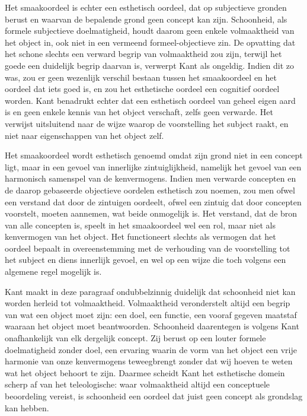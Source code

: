 \begin{mdframed}[leftmargin=0pt,rightmargin=0pt,backgroundcolor=blue!6,linecolor=white,innertopmargin=6pt,innerbottommargin=6pt]
Het smaakoordeel is echter een esthetisch oordeel, dat op subjectieve gronden berust en waarvan de bepalende grond geen concept kan zijn. Schoonheid, als formele subjectieve doelmatigheid, houdt daarom geen enkele volmaaktheid van het object in, ook niet in een vermeend formeel-objectieve zin. De opvatting dat het schone slechts een verward begrip van volmaaktheid zou zijn, terwijl het goede een duidelijk begrip daarvan is, verwerpt Kant als ongeldig. Indien dit zo was, zou er geen wezenlijk verschil bestaan tussen het smaakoordeel en het oordeel dat iets goed is, en zou het esthetische oordeel een cognitief oordeel worden. Kant benadrukt echter dat een esthetisch oordeel van geheel eigen aard is en geen enkele kennis van het object verschaft, zelfs geen verwarde. Het verwijst uitsluitend naar de wijze waarop de voorstelling het subject raakt, en niet naar eigenschappen van het object zelf.

Het smaakoordeel wordt esthetisch genoemd omdat zijn grond niet in een concept ligt, maar in een gevoel van innerlijke zintuiglijkheid, namelijk het gevoel van een harmonisch samenspel van de kenvermogens. Indien men verwarde concepten en de daarop gebaseerde objectieve oordelen esthetisch zou noemen, zou men ofwel een verstand dat door de zintuigen oordeelt, ofwel een zintuig dat door concepten voorstelt, moeten aannemen, wat beide onmogelijk is. Het verstand, dat de bron van alle concepten is, speelt in het smaakoordeel wel een rol, maar niet als kenvermogen van het object. Het functioneert slechts als vermogen dat het oordeel bepaalt in overeenstemming met de verhouding van de voorstelling tot het subject en diens innerlijk gevoel, en wel op een wijze die toch volgens een algemene regel mogelijk is.

\bigskip
Kant maakt in deze paragraaf ondubbelzinnig duidelijk dat schoonheid niet kan worden herleid tot volmaaktheid. Volmaaktheid veronderstelt altijd een begrip van wat een object moet zijn: een doel, een functie, een vooraf gegeven maatstaf waaraan het object moet beantwoorden. Schoonheid daarentegen is volgens Kant onafhankelijk van elk dergelijk concept. Zij berust op een louter formele doelmatigheid zonder doel, een ervaring waarin de vorm van het object een vrije harmonie van onze kenvermogens teweegbrengt zonder dat wij hoeven te weten wat het object behoort te zijn. Daarmee scheidt Kant het esthetische domein scherp af van het teleologische: waar volmaaktheid altijd een conceptuele beoordeling vereist, is schoonheid een oordeel dat juist geen concept als grondslag kan hebben.


\end{mdframed}
